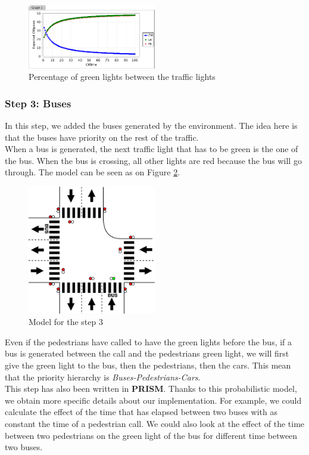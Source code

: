 \begin{figure}[H]\label{fig:prism1}
  \centering
    \includegraphics[width=0.5\textwidth]{picture/graphprism.png}
    \caption{Percentage of green lights between the traffic lights}
\end{figure}


\subsubsection{Step 3: Buses}
In this step, we added the buses generated by the environment. The idea here is that the buses have priority on the rest of the traffic. \\
When a bus is generated, the next traffic light that has to be green is the one of the bus. When the bus is crossing, all other lights are red because the bus will go through. The model can be seen as on Figure \ref{fig:step3bus}. \\

\begin{figure}[H]\label{fig:step3bus}
  \centering
    \includegraphics[width=0.5\textwidth]{picture/model/trafficlight_step3_s2.png}
    \caption{Model for the step 3}
\end{figure}


\noindent Even if the pedestrians have called to have the green lights before the bus, if a bus is generated between the call and the pedestrians green light, we will first give the green light to the bus, then the pedestrians, then the cars. This mean that the priority hierarchy is \textit{Buses-Pedestrians-Cars}. \\
This step has also been written in \textbf{PRISM}. Thanks to this probabilistic model, we obtain more specific details about our implementation. For example, we could calculate the effect of the time that has elapsed between two buses with as constant the time of a pedestrian call. We could also look at the effect of the time between two pedestrians on the green light of the bus for different time between two buses. \\

